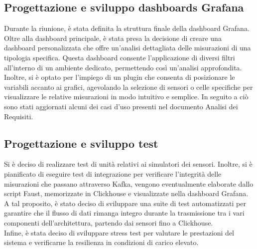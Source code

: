 \documentclass{article}
\begin{document}
    \subsection{Progettazione e sviluppo dashboards Grafana}
    Durante la riunione, è stata definita la struttura finale della dashboard Grafana. Oltre alla dashboard principale, è stata presa la decisione di creare una dashboard personalizzata che offre un'analisi dettagliata delle misurazioni di una tipologia specifica. Questa dashboard consente l'applicazione di diversi filtri all'interno di un ambiente dedicato, permettendo così un'analisi approfondita. \\
    Inoltre, si è optato per l'impiego di un plugin che consenta di posizionare le variabili accanto ai grafici, agevolando la selezione di sensori o celle specifiche per visualizzare le relative misurazioni in modo intuitivo e semplice. In seguito a ciò sono stati aggiornati alcuni dei casi d’uso presenti nel documento Analisi dei Requisiti.

    \subsection{Progettazione e sviluppo test}
    Si è deciso di realizzare test di unità relativi ai simulatori dei sensori. Inoltre, si è pianificato di eseguire test di integrazione per verificare l'integrità delle misurazioni che passano attraverso Kafka, vengono eventualmente elaborate dallo script Faust, memorizzate in Clickhouse e visualizzate nella dashboard Grafana. A tal proposito, è stato deciso di sviluppare una suite di test automatizzati per garantire che il flusso di dati rimanga integro durante la trasmissione tra i vari componenti dell'architettura, partendo dai sensori fino a Clickhouse. \\
    Infine, è stata deciso di sviluppare stress test per valutare le prestazioni del sistema e verificarne la resilienza in condizioni di carico elevato.
\end{document}
